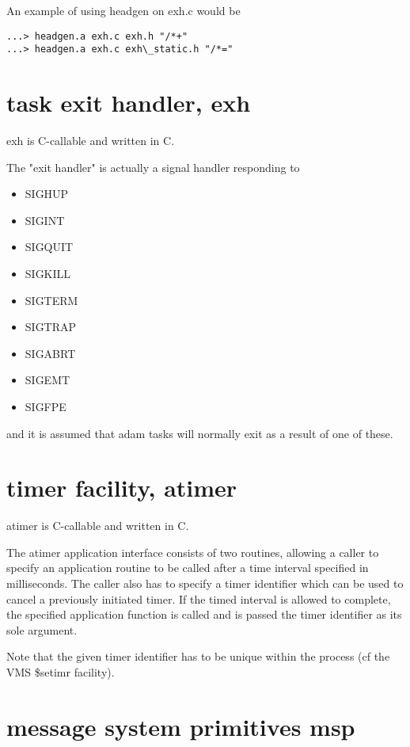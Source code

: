 An example of using headgen on exh.c would be

\begin{verbatim}
...> headgen.a exh.c exh.h "/*+"
...> headgen.a exh.c exh\_static.h "/*="
\end{verbatim}

\section {task exit handler, exh}

exh is C-callable and written in C.

The "exit handler" is actually a signal handler responding to 

\begin{itemize}
\item SIGHUP
\item SIGINT
\item SIGQUIT
\item SIGKILL
\item SIGTERM
\item SIGTRAP
\item SIGABRT
\item SIGEMT
\item SIGFPE
\end{itemize}

and it is assumed that adam tasks will normally exit as a result of one of
these. 

\section {timer facility, atimer}

atimer is C-callable and written in C.

The atimer application interface consists of two routines, allowing a
caller to specify an application routine to be called after a time
interval specified in milliseconds. The caller also has to specify a
timer identifier which can be used to cancel a previously initiated
timer. If the timed interval is allowed to complete, the specified
application function is called and is passed the timer identifier as its
sole argument.

Note that the given timer identifier has to be unique within the process
(cf the VMS \$setimr facility).


\section {message system primitives msp}

